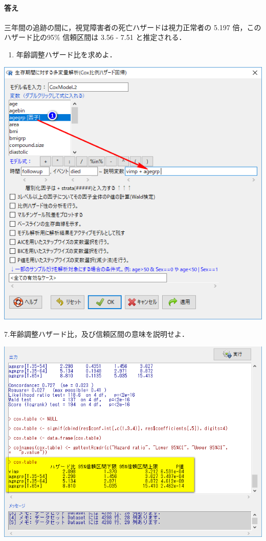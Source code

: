 \documentclass[11pt,]{problemset}
\providecommand{\tightlist}{%
  \setlength{\itemsep}{0pt}\setlength{\parskip}{0pt}}
\let\oldparagraph\paragraph
\renewcommand{\paragraph}[1]{\oldparagraph{#1}\mbox{}}
\begin{document}
\hypertarget{-8}{%
\paragraph{答え}\label{-8}}

三年間の追跡の間に，視覚障害者の死亡ハザードは視力正常者の 5.197
倍，このハザード比の95\% 信頼区間は 3.56 - 7.51 と推定される．

\newpage

\begin{enumerate}
\def\labelenumi{\arabic{enumi}.}
\setcounter{enumi}{5}
\tightlist
\item
  年齢調整ハザード比を求めよ．
\end{enumerate}

\begin{center}\includegraphics[width=0.6\linewidth,height=0.4\textheight]{pic/survival18} \end{center}

7.年齢調整ハザード比，及び信頼区間の意味を説明せよ．

\begin{center}\includegraphics[width=0.6\linewidth,height=0.4\textheight]{pic/survival19} \end{center}
\end{document}
